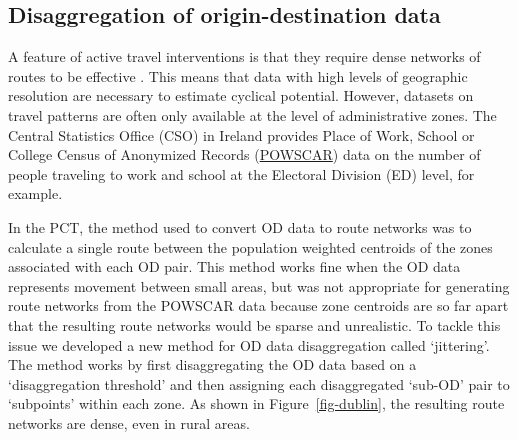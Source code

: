 \documentclass[
  super,
  preprint,
  3p]{elsarticle}
\begin{document}
\subsection{Disaggregation of origin-destination
data}\label{sec-disaggregation}

A feature of active travel interventions is that they require dense
networks of routes to be effective \citep{parkin2018}. This means that
data with high levels of geographic resolution are necessary to estimate
cyclical potential. However, datasets on travel patterns are often only
available at the level of administrative zones. The Central Statistics
Office (CSO) in Ireland provides Place of Work, School or College Census
of Anonymized Records
(\href{https://www.cso.ie/en/census/census2016reports/powscar/}{POWSCAR})
data on the number of people traveling to work and school at the
Electoral Division (ED) level, for example.

In the PCT, the method used to convert OD data to route networks was to
calculate a single route between the population weighted centroids of
the zones associated with each OD pair. This method works fine when the
OD data represents movement between small areas, but was not appropriate
for generating route networks from the POWSCAR data because zone
centroids are so far apart that the resulting route networks would be
sparse and unrealistic. To tackle this issue we developed a new method
for OD data disaggregation called `jittering'. The method works by first
disaggregating the OD data based on a `disaggregation threshold' and
then assigning each disaggregated `sub-OD' pair to `subpoints' within
each zone. As shown in Figure~\ref{fig-dublin}, the resulting route
networks are dense, even in rural areas.
\end{document}

